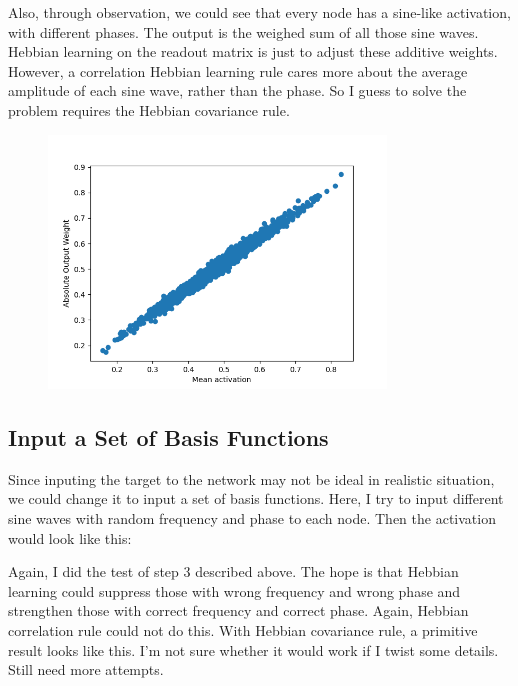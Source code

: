 \documentclass[12pt, a4paper]{article}
\begin{document}
Also, through observation, we could see that every node has a sine-like activation, with different phases. The output is the weighed sum of all those sine waves. Hebbian learning on the readout matrix is just to adjust these additive weights. However, a correlation Hebbian learning rule cares more about the average amplitude of each sine wave, rather than the phase. So I guess to solve the problem requires the Hebbian covariance rule.

\begin{figure}[H]
    \centering
    \includegraphics[width=0.8\textwidth]{RNN/FORCE/fig/FORCE_fbtargethebb_weightcorractv.png} \\
\end{figure}

\newpage

\subsection*{Input a Set of Basis Functions}

Since inputing the target to the network may not be ideal in realistic situation, we could change it to input a set of basis functions. Here, I try to input different sine waves with random frequency and phase to each node. Then the activation would look like this:

Again, I did the test of step 3 described above. The hope is that Hebbian learning could suppress those with wrong frequency and wrong phase and strengthen those with correct frequency and correct phase. Again, Hebbian correlation rule could not do this. With Hebbian covariance rule, a primitive result looks like this. I'm not sure whether it would work if I twist some details. Still need more attempts.
\end{document}
